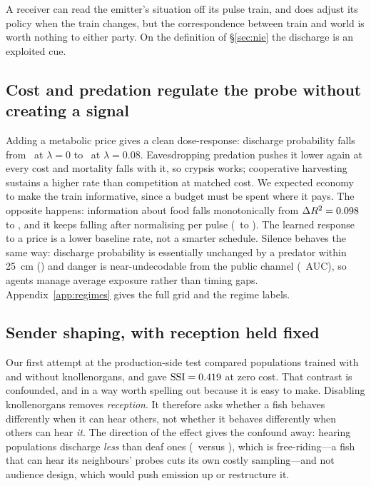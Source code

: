 A receiver can read the emitter's situation off its pulse train, and does adjust
its policy when the train changes, but the correspondence between train and world
is worth nothing to either party. On the definition of \S\ref{sec:nie} the
discharge is an exploited cue.

\subsection{Cost and predation regulate the probe without creating a signal}

Adding a metabolic price gives a clean dose-response: discharge probability falls
from \EmitCostZero\ at $\lambda=0$ to \EmitCostHigh\ at $\lambda=0.08$.
Eavesdropping predation pushes it lower again at every cost and mortality falls
with it, so crypsis works; cooperative harvesting sustains a higher rate than
competition at matched cost. We expected economy to make the train informative,
since a budget must be spent where it pays. The opposite happens: information
about food falls monotonically from $\Delta R^2 = 0.098$ to
\ContentCostHigh, and it keeps falling after normalising per pulse
(\PSPerPulseZero\ to \PSPerPulseHigh). The learned response to a price is a lower
baseline rate, not a smarter schedule. Silence behaves the same way: discharge
probability is essentially unchanged by a predator within \SI{25}{\centi\metre}
(\SilenceDangerDiff) and danger is near-undecodable from the public channel
(\DangerAUC\ AUC), so agents manage average exposure rather than timing gaps.
Appendix~\ref{app:regimes} gives the full grid and the regime labels.

\subsection{Sender shaping, with reception held fixed}

Our first attempt at the production-side test compared populations trained with
and without knollenorgans, and gave $\mathrm{SSI}=0.419$ at zero cost.
That contrast is confounded, and in a way worth spelling out because it is easy
to make. Disabling knollenorgans removes \emph{reception}. It therefore asks
whether a fish behaves differently when it can hear others, not whether it
behaves differently when others can hear \emph{it}. The direction of the effect
gives the confound away: hearing populations discharge \emph{less} than deaf ones
(\EmitHearZero\ versus \EmitDeafZero), which is free-riding---a fish that can
hear its neighbours' probes cuts its own costly sampling---and not audience
design, which would push emission up or restructure it.

